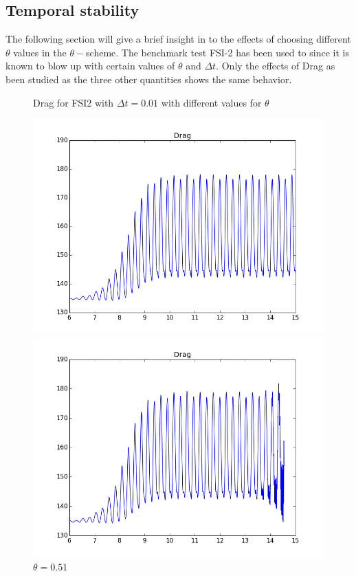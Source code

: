 \subsection{Temporal stability}
The following section will give a brief insight in to the effects of choosing different $\theta$ values in the $\theta-$scheme. The benchmark test FSI-2 has been used to since it is known to blow up with certain values of $\theta$ and $\Delta t$. Only the effects of Drag as been studied as the three other quantities shows the same behavior.   

\begin{figure}[H]  \label{fig:FSI2drag_plots} 
  \caption {Drag for FSI2 with $\Delta t = 0.01$ with different values for $\theta$}
  \begin{minipage}[b]{0.6\linewidth}
    \centering
    \includegraphics[scale=0.40]{./Verification_Validation/Temporal_stability/FSI2_001_051_big.png} 
    \caption{$\theta = 0.51 $} 
    \vspace{4ex}
  \end{minipage}%
  \begin{minipage}[b]{0.6\linewidth}
    \centering
    \includegraphics[scale=0.40]{./Verification_Validation/Temporal_stability/FSI2_001_050_big.png} 

\end{minipage}
\end{figure}
